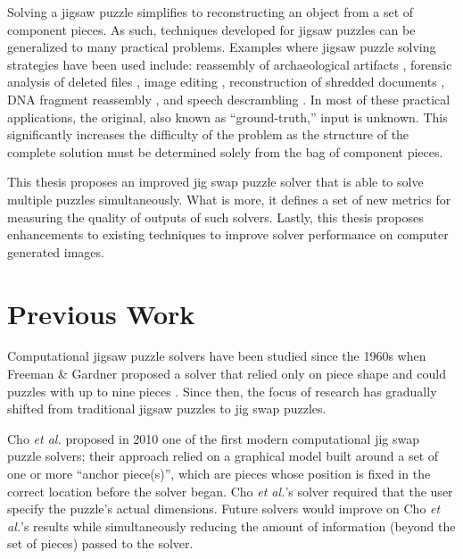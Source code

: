 \documentclass{report}
\begin{document}
Solving a jigsaw puzzle simplifies to reconstructing an object from a set of component pieces.  As such, techniques developed for jigsaw puzzles can be generalized to many practical problems.  Examples where jigsaw puzzle solving strategies have been used include: reassembly of archaeological artifacts \cite{brown2008, koller2006}, forensic analysis of deleted files \cite{garfinkel2010}, image editing \cite{cho2008}, reconstruction of shredded documents \cite{zhu2008}, DNA fragment reassembly \cite{marande2007}, and speech descrambling \cite{zhao2007}.  In most of these practical applications, the original, also known as ``ground-truth,'' input is unknown.  This significantly increases the difficulty of the problem as the structure of the complete solution must be determined solely from the bag of component pieces.

This thesis proposes an improved jig swap puzzle solver that is able to solve multiple puzzles simultaneously.  What is more, it defines a set of new metrics for measuring the quality of outputs of such solvers.  Lastly, this thesis proposes enhancements to existing techniques to improve solver performance on computer generated images.




\pagebreak
\section{Previous Work}\label{sec:previousWork}

Computational jigsaw puzzle solvers have been studied since the 1960s when Freeman \& Gardner proposed a solver that relied only on piece shape and could puzzles with up to nine pieces \cite{freeman1964}.  Since then, the focus of research has gradually shifted from traditional jigsaw puzzles to jig swap puzzles.  

Cho \textit{et al.} \citep{cho2010} proposed in 2010 one of the first modern computational jig swap puzzle solvers; their approach relied on a graphical model built around a set of one or more ``anchor piece(s)'', which are pieces whose position is fixed in the correct location before the solver began.  Cho \textit{et al.}'s solver required that the user specify the puzzle's actual dimensions.  Future solvers would improve on Cho \textit{et al.}'s results while simultaneously reducing the amount of information (beyond the set of pieces) passed to the solver.
\end{document}

